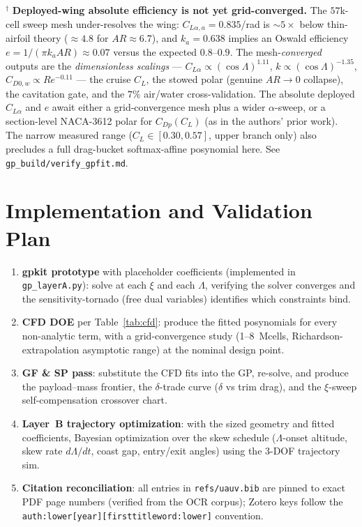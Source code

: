 \documentclass{new-aiaa}
\begin{document}
\noindent$^\dagger$ \textbf{Deployed-wing absolute efficiency is not yet grid-converged.} The
$57$k-cell sweep mesh under-resolves the wing: $C_{L\alpha,a}=0.835$/rad is $\sim\!5\times$ below
thin-airfoil theory ($\approx4.8$ for $AR\!\approx\!6.7$), and $k_a=0.638$ implies an Oswald
efficiency $e=1/(\pi k_a AR)\approx0.07$ versus the expected $0.8$--$0.9$. The mesh-\emph{converged}
outputs are the \emph{dimensionless scalings} --- $C_{L\alpha}\!\propto\!(\cos\Lambda)^{1.11}$,
$k\!\propto\!(\cos\Lambda)^{-1.35}$, $C_{D0,w}\!\propto\!Re^{-0.11}$ --- the cruise $C_L$, the stowed
polar (genuine $AR\!\to\!0$ collapse), the cavitation gate, and the $7\%$ air/water cross-validation.
The absolute deployed $C_{L\alpha}$ and $e$ await either a grid-convergence mesh plus a wider
$\alpha$-sweep, or a section-level NACA-3612 polar for $C_{Dp}(C_L)$ (as in the authors' prior
work). The narrow measured range ($C_L\!\in\![0.30,0.57]$, upper branch only) also precludes a
full drag-bucket softmax-affine posynomial here. See \texttt{gp\_build/verify\_gpfit.md}.

\section{Implementation and Validation Plan}
\begin{enumerate}
\item \textbf{gpkit prototype} with placeholder coefficients (implemented in \texttt{gp\_layerA.py}):
  solve at each $\xi$ and each $\Lambda$, verifying the solver converges and the
  sensitivity-tornado (free dual variables) identifies which constraints bind.
\item \textbf{CFD DOE} per Table~\ref{tab:cfd}: produce the fitted posynomials for every non-analytic
  term, with a grid-convergence study (1--8~Mcells, Richardson-extrapolation asymptotic range) at
  the nominal design point.
\item \textbf{GF \& SP pass}: substitute the CFD fits into the GP, re-solve, and produce the
  payload--mass frontier, the $\delta$-trade curve ($\delta$ vs trim drag), and the $\xi$-sweep
  self-compensation crossover chart.
\item \textbf{Layer~B trajectory optimization}: with the sized geometry and fitted coefficients,
  Bayesian optimization over the skew schedule ($\Lambda$-onset altitude, skew rate
  $d\Lambda/dt$, coast gap, entry/exit angles) using the 3-DOF trajectory sim.
\item \textbf{Citation reconciliation}: all entries in \texttt{refs/uauv.bib} are pinned to exact
  PDF page numbers (verified from the OCR corpus); Zotero keys follow the
  \texttt{auth:lower[year][firsttitleword:lower]} convention.
\end{enumerate}



\end{document}
